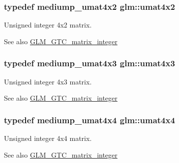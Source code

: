 \subsubsection[{umat4x2}]{\setlength{\rightskip}{0pt plus 5cm}typedef mediump\+\_\+umat4x2 {\bf glm\+::umat4x2}}\label{group__gtc__matrix__integer_ga13e8392218e9b6e1b7f194a21b5c88bf}
Unsigned integer 4x2 matrix. \begin{DoxySeeAlso}{See also}
\hyperlink{group__gtc__matrix__integer}{G\+L\+M\+\_\+\+G\+T\+C\+\_\+matrix\+\_\+integer} 
\end{DoxySeeAlso}
\hypertarget{group__gtc__matrix__integer_ga08373f5588a54da1a48e5e55c7d51004}{}
\subsubsection[{umat4x3}]{\setlength{\rightskip}{0pt plus 5cm}typedef mediump\+\_\+umat4x3 {\bf glm\+::umat4x3}}\label{group__gtc__matrix__integer_ga08373f5588a54da1a48e5e55c7d51004}
Unsigned integer 4x3 matrix. \begin{DoxySeeAlso}{See also}
\hyperlink{group__gtc__matrix__integer}{G\+L\+M\+\_\+\+G\+T\+C\+\_\+matrix\+\_\+integer} 
\end{DoxySeeAlso}
\hypertarget{group__gtc__matrix__integer_gae0931b79e808fb0983848778a60eb548}{}
\subsubsection[{umat4x4}]{\setlength{\rightskip}{0pt plus 5cm}typedef mediump\+\_\+umat4x4 {\bf glm\+::umat4x4}}\label{group__gtc__matrix__integer_gae0931b79e808fb0983848778a60eb548}
Unsigned integer 4x4 matrix. \begin{DoxySeeAlso}{See also}
\hyperlink{group__gtc__matrix__integer}{G\+L\+M\+\_\+\+G\+T\+C\+\_\+matrix\+\_\+integer} 
\end{DoxySeeAlso}
